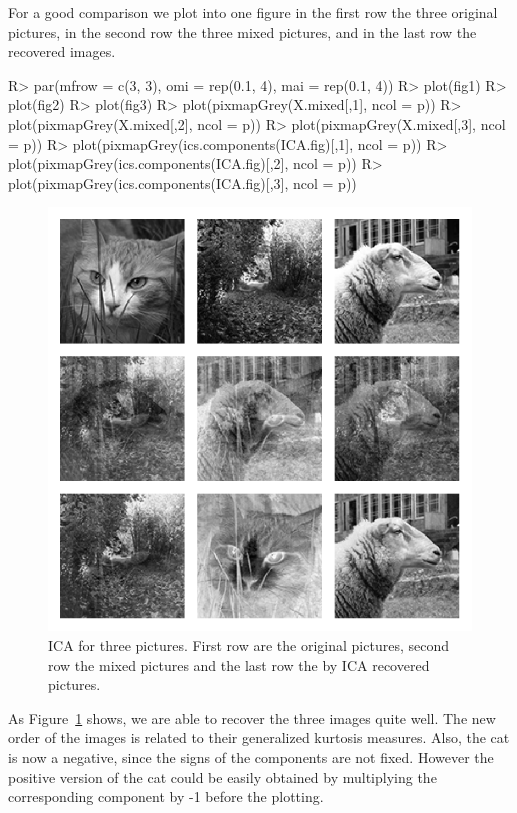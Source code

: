 \documentclass[article,nojss]{jss}
\begin{document}
For a good comparison we plot into one figure in the first row the three original pictures, in the second row the three mixed
pictures, and in the last row the recovered images.

\begin{Schunk}
\begin{Sinput}
R> par(mfrow = c(3, 3), omi = rep(0.1, 4), mai = rep(0.1, 4))
R> plot(fig1)
R> plot(fig2)
R> plot(fig3)
R> plot(pixmapGrey(X.mixed[,1], ncol = p))
R> plot(pixmapGrey(X.mixed[,2], ncol = p))
R> plot(pixmapGrey(X.mixed[,3], ncol = p))
R> plot(pixmapGrey(ics.components(ICA.fig)[,1], ncol = p))
R> plot(pixmapGrey(ics.components(ICA.fig)[,2], ncol = p))
R> plot(pixmapGrey(ics.components(ICA.fig)[,3], ncol = p))
\end{Sinput}
\end{Schunk}

\begin{figure}[t!]
\begin{center}
\includegraphics{ICS-pixmap}
\caption{ICA for three pictures. First row are the original pictures, second row the mixed pictures and the last row the by ICA recovered pictures.}
  \label{picture_ICA}
\end{center}
\end{figure}


As Figure~\ref{picture_ICA} shows, we are able to recover the three images quite well. The new order of the images is related
to their generalized kurtosis measures. Also, the cat is now a negative, since the signs of the components are not fixed.
However the positive version of the cat could be easily obtained by multiplying the corresponding component by -1 before the plotting.
\end{document}

